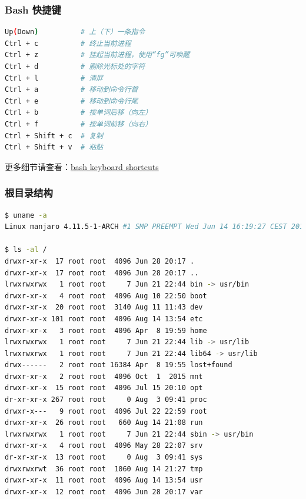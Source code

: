 \subsubsection{Bash 快捷键}
\indent \setlength{\parindent}{2em}
\begin{lstlisting}[language=bash, style=customStyleBashDark, caption=Bash快捷键]
Up(Down)          # 上（下）一条指令
Ctrl + c          # 终止当前进程
Ctrl + z          # 挂起当前进程，使用“fg”可唤醒
Ctrl + d          # 删除光标处的字符
Ctrl + l          # 清屏
Ctrl + a          # 移动到命令行首
Ctrl + e          # 移动到命令行尾
Ctrl + b          # 按单词后移（向左）
Ctrl + f          # 按单词前移（向右）
Ctrl + Shift + c  # 复制
Ctrl + Shift + v  # 粘贴
\end{lstlisting}
\indent 更多细节请查看：\href{https://ss64.com/bash/syntax-keyboard.html}{bash keyboard shortcuts}

\subsubsection{根目录结构}
\indent \setlength{\parindent}{2em}

\begin{lstlisting}[language=bash, style=customStyleBashDark, caption=目录结构]
$ uname -a
Linux manjaro 4.11.5-1-ARCH #1 SMP PREEMPT Wed Jun 14 16:19:27 CEST 2017 x86_64 GNU/Linux

$ ls -al /
drwxr-xr-x  17 root root  4096 Jun 28 20:17 .
drwxr-xr-x  17 root root  4096 Jun 28 20:17 ..
lrwxrwxrwx   1 root root     7 Jun 21 22:44 bin -> usr/bin
drwxr-xr-x   4 root root  4096 Aug 10 22:50 boot
drwxr-xr-x  20 root root  3140 Aug 11 11:43 dev
drwxr-xr-x 101 root root  4096 Aug 14 13:54 etc
drwxr-xr-x   3 root root  4096 Apr  8 19:59 home
lrwxrwxrwx   1 root root     7 Jun 21 22:44 lib -> usr/lib
lrwxrwxrwx   1 root root     7 Jun 21 22:44 lib64 -> usr/lib
drwx------   2 root root 16384 Apr  8 19:55 lost+found
drwxr-xr-x   2 root root  4096 Oct  1  2015 mnt
drwxr-xr-x  15 root root  4096 Jul 15 20:10 opt
dr-xr-xr-x 267 root root     0 Aug  3 09:41 proc
drwxr-x---   9 root root  4096 Jul 22 22:59 root
drwxr-xr-x  26 root root   660 Aug 14 21:08 run
lrwxrwxrwx   1 root root     7 Jun 21 22:44 sbin -> usr/bin
drwxr-xr-x   4 root root  4096 May 28 22:07 srv
dr-xr-xr-x  13 root root     0 Aug  3 09:41 sys
drwxrwxrwt  36 root root  1060 Aug 14 21:27 tmp
drwxr-xr-x  11 root root  4096 Aug 14 13:54 usr
drwxr-xr-x  12 root root  4096 Jun 28 20:17 var
\end{lstlisting}

